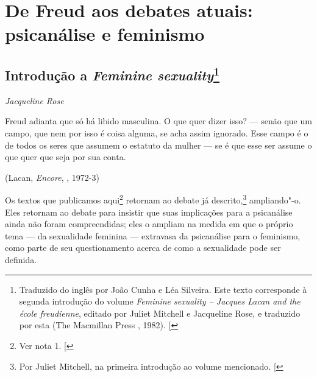 \part{De Freud aos debates atuais:\\ psicanálise e feminismo}


\chapter*{Introdução  a \emph{Feminine sexuality}\footnote{Traduzido
  do inglês por João Cunha e Léa Silveira. Este texto corresponde à
  segunda introdução do volume \emph{Feminine sexuality -- Jacques Lacan
  and the école freudienne}, editado por Juliet Mitchell e
  Jacqueline Rose, e traduzido por esta (The Macmillan Press , 1982).
  {[}\versal{N.~T.}{]}}}

\begin{flushright}
\emph{Jacqueline Rose}
\end{flushright}

\epigraph{Freud adianta que só há libido masculina. O que quer dizer isso? ---
senão que um campo, que nem por isso é coisa alguma, se acha assim
ignorado. Esse campo é o de todos os seres que assumem o estatuto da
mulher --- se é que esse ser assume o que quer que seja por sua conta.}{(Lacan, \emph{Encore}, , 1972-3)}

Os textos que publicamos aqui\footnote{Ver nota 1. {[}\versal{N.~T.}{]}} retornam
ao debate já descrito,\footnote{Por Juliet Mitchell, na primeira
  introdução ao volume mencionado. {[}\versal{N.~T.}{]}} ampliando"-o. Eles
retornam ao debate para insistir que suas implicações para a psicanálise
ainda não foram compreendidas; eles o ampliam na medida em que o próprio
tema --- da sexualidade feminina --- extravasa da psicanálise para o
feminismo, como parte de seu questionamento acerca de como a sexualidade
pode ser definida.

